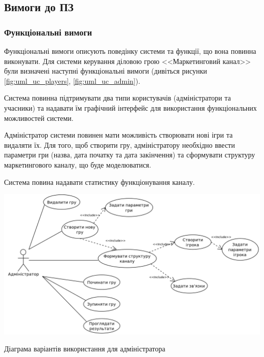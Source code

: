    \subsection{Вимоги до ПЗ}
        \subsubsection{Функціональні вимоги}
Функціональні вимоги описують поведінку системи та функції, що вона повинна виконувати. Для системи керування діловою грою <<Маркетинговий канал>> були визначені наступні функціональні вимоги (дивіться рисунки \ref{fig:uml_uc_players}, \ref{fig:uml_uc_admin}).
            \begin{longEnumerate}
\item Система повинна підтримувати два типи користувачів (адміністратори та учасники) та надавати їм графічний інтерфейс для використання функціональних можливостей системи.
\item Адміністратор системи повинен мати можливість створювати нові ігри та видаляти їх. Для того, щоб створити гру, адміністратору необхідно ввести параметри гри (назва, дата початку та дата закінчення) та сформувати структуру маркетингового каналу, що буде моделюватися. 
\item Система повина надавати статистику функціонування каналу.

            \begin{stdfigure}
                \includegraphics[width=7in]{images/uml_uc_admin.png}
                \caption{Діаграма варіантів використання для адміністратора}
                \label{fig:uml_uc_admin}
            \end{stdfigure}


\end{longEnumerate}
